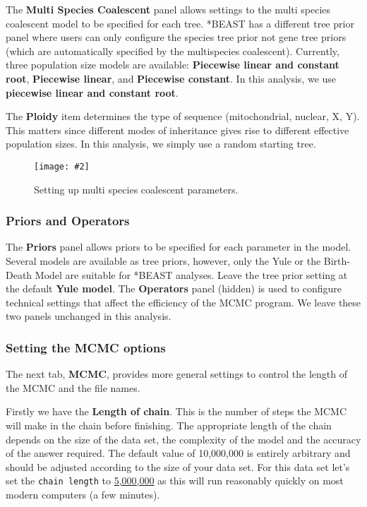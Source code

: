 \documentclass{article}
\newcommand{\includeimage}[2][]{%
\texttt{[image: \#2]}
}
\newcommand{\chainLength}{{5,000,000}}
\begin{document}
The {\bf Multi Species Coalescent} panel allows settings to the multi species coalescent model to be specified for each tree. *BEAST has a different tree prior panel where users can only configure the species tree prior not gene tree priors (which are automatically specified by the multispecies coalescent). 
Currently, three population size models are available: \textbf{Piecewise linear and constant root}, \textbf{Piecewise linear}, and \textbf{Piecewise constant}. In this analysis, we use \textbf{piecewise linear and constant root}.

The \textbf{Ploidy} item determines the type of sequence (mitochondrial, nuclear, X, Y). This matters since different modes of inheritance gives rise to different effective population sizes. In this analysis, we simply use a random starting tree. 

\begin{figure}
\centering
\includeimage[scale=0.3,clip=true,trim=0 150 0 0]{figures/BEAUti_MSP}

\caption{\label{fig.MSP} Setting up multi species coalescent parameters.}
\end{figure}


\subsubsection*{Priors and Operators}

The {\bf Priors} panel allows priors to be specified for each parameter in the model. 
Several models are available as tree priors, however, only the Yule or the Birth-Death Model are suitable for *BEAST analyses. Leave the tree prior setting at the default \textbf{Yule model}. The {\bf Operators} panel (hidden) is used to configure technical settings that affect the efficiency of the MCMC program. We leave these two panels unchanged in this analysis.

\subsubsection*{Setting the MCMC options }

The next tab, {\bf MCMC}, provides more general
settings to control the length of the MCMC and the file names. 

Firstly we have the \textbf{Length of chain}. This is the number of
steps the MCMC will make in the chain before finishing. The appropriate length of the chain depends on the size of the data set, the complexity of the
model and the accuracy of the answer required. The default value of 10,000,000
is entirely arbitrary and should be adjusted according to the size
of your data set. For this data set let's set the \texttt{chain
length} to \underline{\chainLength{}} as this will run reasonably quickly on most modern
computers (a few minutes).
\end{document}
